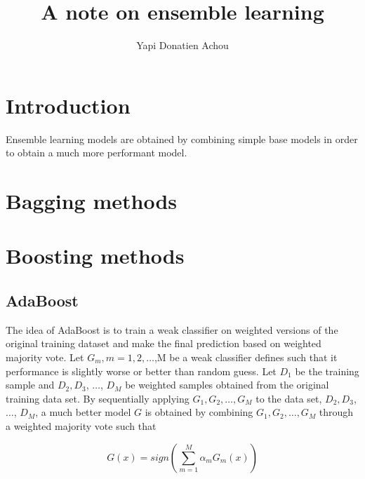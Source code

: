 \documentclass[11pt, oneside]{article}   	%
\title{A note on ensemble learning}
\author{Yapi Donatien Achou}
\begin{document}
\maketitle
\section{Introduction}
Ensemble learning models are obtained by combining simple base models in order to obtain a much more performant model. 
\section{Bagging methods}
\section{Boosting methods}
\subsection{AdaBoost}
The idea of AdaBoost is to train a weak classifier on weighted versions of the original training dataset and make the final prediction based on weighted majority vote.
Let $G_{m}, m = 1,2,\dots$,M be a weak classifier defines such that it performance is slightly worse or better than random guess.
Let $D_{1}$ be the training sample and $D_{2}, D_{3}$, $\dots$, $D_{M} $ be weighted samples obtained from the original training data set. By sequentially applying $G_{1}, G_{2}, \dots, G_{M}$ to the data set, $D_{2}, D_{3}$, $\dots$, $D_{M} $, a much better model $G$ is obtained by combining $G_{1}, G_{2}, \dots, G_{M}$ through a weighted majority vote such that 

\begin{equation}
G(x)= sign\left(  \sum_{m=1}^{M} \alpha_{m}G_{m}(x) \right)
\end{equation}
\end{document}
